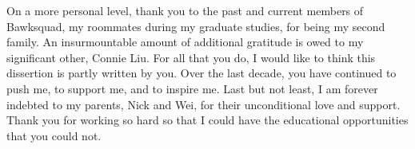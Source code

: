 On a more personal level, thank you to the past and current members of Bawksquad, my roommates during my graduate studies, for being my second family. An insurmountable amount of additional gratitude is owed to my significant other, Connie Liu. For all that you do, I would like to think this dissertion is partly written by you. Over the last decade, you have continued to push me, to support me, and to inspire me. Last but not least, I am forever indebted to my parents, Nick and Wei, for their unconditional love and support. Thank you for working so hard so that I could have the educational opportunities that you could not.

